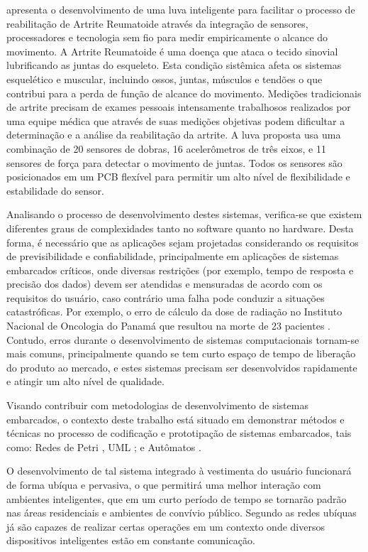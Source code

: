 \cite{OFLYNN:2013} apresenta o desenvolvimento de uma luva inteligente para facilitar o processo de reabilitação de Artrite Reumatoide através da integração de sensores, processadores e tecnologia sem fio para medir empiricamente o alcance do movimento. A Artrite Reumatoide é uma doença que ataca o tecido sinovial lubrificando as juntas do esqueleto. Esta condição sistêmica afeta os sistemas esquelético e muscular, incluindo ossos, juntas, músculos e tendões o que contribui para a perda de função de alcance do movimento. Medições tradicionais de artrite precisam de exames pessoais intensamente trabalhosos realizados por uma equipe médica que através de suas medições objetivas podem dificultar a determinação e a análise da reabilitação da artrite. A luva proposta \cite{OFLYNN:2013} usa uma combinação de 20 sensores de dobras, 16 acelerômetros de três eixos, e 11 sensores de força para detectar o movimento de juntas. Todos os sensores são posicionados em um PCB flexível para permitir um alto nível de flexibilidade e estabilidade do sensor.


Analisando o processo de desenvolvimento destes sistemas, verifica-se que existem diferentes graus de complexidades tanto no software quanto no hardware. Desta forma, é necessário que as aplicações sejam projetadas considerando os requisitos de previsibilidade e confiabilidade, principalmente em aplicações de sistemas embarcados críticos, onde diversas restrições (por exemplo, tempo de resposta e precisão dos dados) devem ser atendidas e mensuradas de acordo com os requisitos do usuário, caso contrário uma falha pode conduzir a situações catastróficas. Por exemplo, o erro de cálculo da dose de radiação no Instituto Nacional de Oncologia do Panamá que resultou na morte de 23 pacientes \cite{WONG:2010}. Contudo, erros durante o desenvolvimento de sistemas computacionais tornam-se mais comuns, principalmente quando se tem curto espaço de tempo de liberação do produto ao mercado, e estes sistemas precisam ser desenvolvidos rapidamente e atingir um alto nível de qualidade. 


Visando contribuir com metodologias de desenvolvimento de sistemas embarcados, o contexto deste trabalho está situado em demonstrar métodos e técnicas no processo de codificação e prototipação de sistemas embarcados, tais como: Redes de Petri \cite{BENDERS:1992} \cite{VALK:2002}, UML \cite{ROCHA:2011}; e Autômatos \cite{LAMPKA:2009}. 


O desenvolvimento de tal sistema integrado à vestimenta do usuário funcionará de forma ubíqua e pervasiva, o que permitirá uma melhor interação com ambientes inteligentes, que em um curto período de tempo se tornarão padrão nas áreas residenciais e ambientes de convívio público. Segundo \cite{Weiser:1999} as redes ubíquas já são capazes de realizar certas operações em um contexto onde diversos dispositivos inteligentes estão em constante comunicação.  


